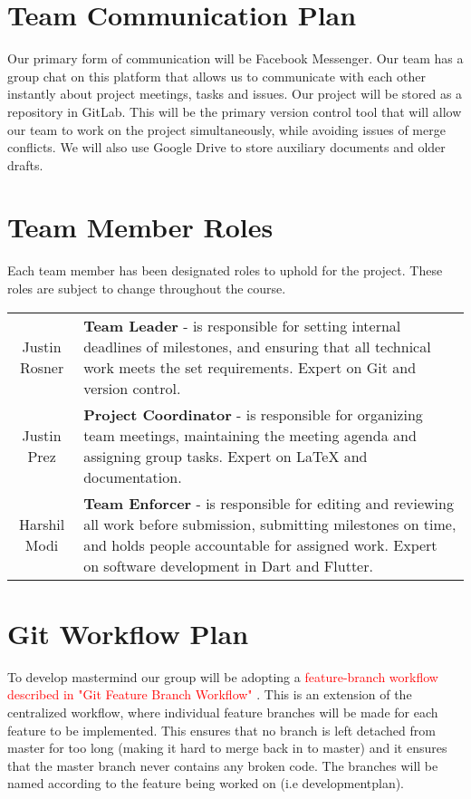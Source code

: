 \documentclass{article}
\begin{document}
\section{Team Communication Plan}

Our primary form of communication will be Facebook Messenger. Our team has a group chat on this platform that allows us to communicate with each other instantly about project meetings, tasks and issues. Our project will be stored as a repository in GitLab. This will be the primary version control tool that will allow our team to work on the project simultaneously, while avoiding issues of merge conflicts. We will also use Google Drive to store auxiliary documents and older drafts.


\section{Team Member Roles}

Each team member has been designated roles to uphold for the project. These roles are subject to change throughout the course.

\begin{table}[h!]
    \centering
    \begin{tabular}{ c| m{26em} }
        Justin Rosner & \textbf{Team Leader} - is responsible for setting internal deadlines of milestones, and ensuring that all technical work meets the set requirements. Expert on Git and version control.\\
        Justin Prez & \textbf{Project Coordinator} - is responsible for organizing team meetings, maintaining the meeting agenda and assigning group tasks. Expert on LaTeX and documentation.\\
        Harshil Modi & \textbf{Team Enforcer} - is responsible for editing and reviewing all work before submission, submitting milestones on time, and holds people accountable for assigned work. Expert on software development in Dart and Flutter.
    \end{tabular}

    \label{tab:my_label}
\end{table}


\section{Git Workflow Plan}
To develop mastermind our group will be adopting a \textcolor{red}{feature-branch workflow described in "Git Feature Branch Workflow" \cite{feature-branch}}. This is an extension of the centralized workflow, where individual feature branches will be made for each feature to be implemented. This ensures that no branch is left detached from master for too long (making it hard to merge back in to master) and it ensures that the master branch never contains any broken code. The branches will be named according to the feature being worked on (i.e developmentplan). 
\end{document}
